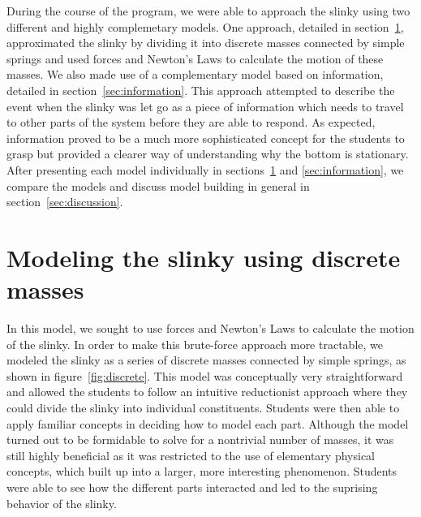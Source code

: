\documentclass[prb,preprint,superscriptaddress]{revtex4-1}
\renewcommand{\sec}[1]{section~\ref{sec:#1}}
\newcommand{\secs}[2]{sections~\ref{sec:#1} and \ref{sec:#2}}
\newcommand{\subsec}[1]{section~\ref{subsec:#1}}
\newcommand{\fig}[1]{figure~\ref{fig:#1}}
\begin{document}
During the course of the program, we were able to approach the slinky using two different
and highly complemetary models.
One approach, detailed in \sec{forces}, approximated
the slinky by dividing it into discrete masses connected by simple springs and used
forces and Newton's Laws to calculate the motion of these masses.
We also made use of a complementary
model based on information, detailed in \sec{information}. This approach attempted
to describe the event when the slinky was let go as a piece of information which
needs to travel to other parts of the system before they are able to respond.
As expected, information proved to be a much more sophisticated concept for the
students to grasp but provided a clearer way of understanding why the bottom
is stationary. After presenting each
model individually in \secs{forces}{information}, we compare the models and
discuss model building in general in \sec{discussion}.

\section{Modeling the slinky using discrete masses}
\label{sec:forces}

In this model, we sought to use forces and Newton's Laws to calculate the
motion of the slinky. In order to make this brute-force approach more tractable, we
modeled the slinky as a series of discrete masses connected by simple springs, as
shown in \fig{discrete}. This
model was conceptually very straightforward and allowed the students to follow an
intuitive reductionist approach where they could divide the slinky into individual
constituents. Students were then able to apply familiar concepts in deciding how to model each part. Although the model turned out to
be formidable to solve for a nontrivial number of masses, it was still highly beneficial as it was restricted to the
use of elementary physical concepts, which built up into a larger, more interesting
phenomenon. Students were able to see how the different parts interacted and led
to the suprising behavior of the slinky.


\end{document}
